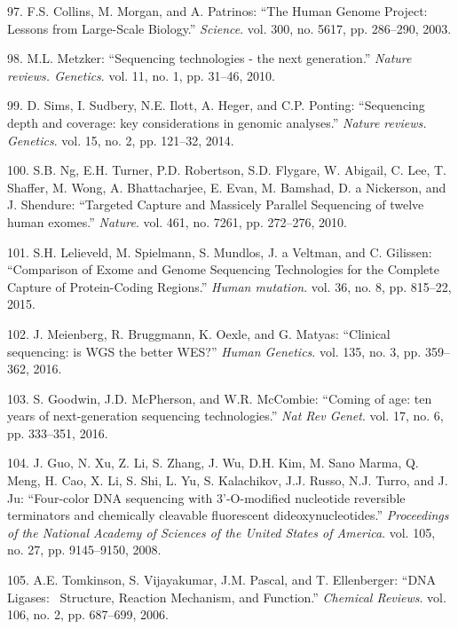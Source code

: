 \documentclass[12pt,twoside]{reedthesis}
\theoremstyle{definition}
\theoremstyle{definition}
\theoremstyle{remark}
\begin{document}
  \hypertarget{ref-Collins2003}{}
  97. F.S. Collins, M. Morgan, and A. Patrinos: ``The Human Genome
  Project: Lessons from Large-Scale Biology.'' \emph{Science}. vol. 300,
  no. 5617, pp. 286--290, 2003.
  
  \hypertarget{ref-Metzker2010}{}
  98. M.L. Metzker: ``Sequencing technologies - the next generation.''
  \emph{Nature reviews. Genetics}. vol. 11, no. 1, pp. 31--46, 2010.
  
  \hypertarget{ref-Sims2014}{}
  99. D. Sims, I. Sudbery, N.E. Ilott, A. Heger, and C.P. Ponting:
  ``Sequencing depth and coverage: key considerations in genomic
  analyses.'' \emph{Nature reviews. Genetics}. vol. 15, no. 2, pp.
  121--32, 2014.
  
  \hypertarget{ref-Ng2010}{}
  100. S.B. Ng, E.H. Turner, P.D. Robertson, S.D. Flygare, W. Abigail, C.
  Lee, T. Shaffer, M. Wong, A. Bhattacharjee, E. Evan, M. Bamshad, D. a
  Nickerson, and J. Shendure: ``Targeted Capture and Massicely Parallel
  Sequencing of twelve human exomes.'' \emph{Nature}. vol. 461, no. 7261,
  pp. 272--276, 2010.
  
  \hypertarget{ref-Lelieveld2015}{}
  101. S.H. Lelieveld, M. Spielmann, S. Mundlos, J. a Veltman, and C.
  Gilissen: ``Comparison of Exome and Genome Sequencing Technologies for
  the Complete Capture of Protein-Coding Regions.'' \emph{Human mutation}.
  vol. 36, no. 8, pp. 815--22, 2015.
  
  \hypertarget{ref-Meienberg2016}{}
  102. J. Meienberg, R. Bruggmann, K. Oexle, and G. Matyas: ``Clinical
  sequencing: is WGS the better WES?'' \emph{Human Genetics}. vol. 135,
  no. 3, pp. 359--362, 2016.
  
  \hypertarget{ref-Goodwin2016}{}
  103. S. Goodwin, J.D. McPherson, and W.R. McCombie: ``Coming of age: ten
  years of next-generation sequencing technologies.'' \emph{Nat Rev
  Genet}. vol. 17, no. 6, pp. 333--351, 2016.
  
  \hypertarget{ref-Guo2008}{}
  104. J. Guo, N. Xu, Z. Li, S. Zhang, J. Wu, D.H. Kim, M. Sano Marma, Q.
  Meng, H. Cao, X. Li, S. Shi, L. Yu, S. Kalachikov, J.J. Russo, N.J.
  Turro, and J. Ju: ``Four-color DNA sequencing with 3'-O-modified
  nucleotide reversible terminators and chemically cleavable fluorescent
  dideoxynucleotides.'' \emph{Proceedings of the National Academy of
  Sciences of the United States of America}. vol. 105, no. 27, pp.
  9145--9150, 2008.
  
  \hypertarget{ref-Tomkinson2006}{}
  105. A.E. Tomkinson, S. Vijayakumar, J.M. Pascal, and T. Ellenberger:
  ``DNA Ligases:~ Structure, Reaction Mechanism, and Function.''
  \emph{Chemical Reviews}. vol. 106, no. 2, pp. 687--699, 2006.
  
\end{document}
